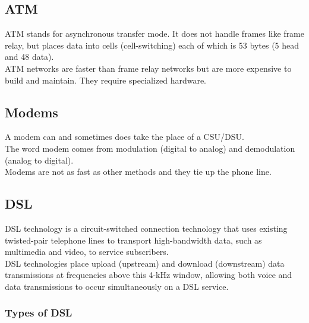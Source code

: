 \subsection{ATM}

ATM stands for asynchronous transfer mode. It does not handle frames like
frame relay, but places data into cells (cell-switching) each of which is 53
bytes (5 head and 48 data).\\

ATM networks are faster than frame relay networks but are more expensive to
build and maintain. They require specialized hardware.

\subsection{Modems}

A modem can and sometimes does take the place of a CSU/DSU.\\

The word modem comes from modulation (digital to analog) and demodulation
(analog to digital).\\

Modems are not as fast as other methods and they tie up the phone line.

\subsection{DSL}

DSL technology is a circuit-switched connection technology that uses existing
twisted-pair telephone lines to transport high-bandwidth data, such as
multimedia and video, to service subscribers.\\

DSL technologies place upload (upstream) and download (downstream) data
transmissions at frequencies above this 4-kHz window, allowing both voice and
data transmissions to occur simultaneously on a DSL service.

\subsubsection{Types of DSL}

